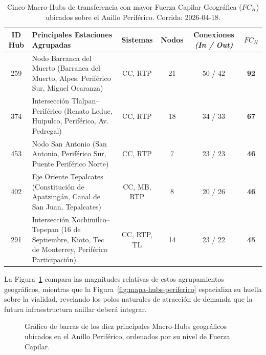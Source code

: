 \begin{table}[H]
    \centering
    \caption[Top 5 Macro-Hubs con mayor Fuerza Capilar sobre el Eje Periférico]{
    Cinco Macro-Hubs de transferencia con mayor Fuerza Capilar Geográfica
    ($FC_H$) ubicados sobre el Anillo Periférico. Corrida: 2026-04-18.}
    \label{tab:periferico-hubs-geo}
    \fontsize{8.5pt}{10.5pt}\selectfont
    \begin{tabularx}{\textwidth}{|c|X|c|c|c|c|}
        \hline
        \textbf{ID Hub} & \textbf{Principales Estaciones Agrupadas} & \textbf{Sistemas} & \textbf{Nodos} & \textbf{Conexiones} \textit{(In / Out)} & \textbf{$FC_H$} \\
        \hline
        259 & Nodo Barranca del Muerto (Barranca del Muerto, Alpes, Periférico Sur, Miguel Ocaranza) & CC, RTP & 21 & 50 / 42 & \textbf{92} \\
        \hline
        374 & Intersección Tlalpan--Periférico (Renato Leduc, Huipulco, Periférico, Av. Pedregal) & CC, RTP & 18 & 34 / 33 & \textbf{67} \\
        \hline
        453 & Nodo San Antonio (San Antonio, Periférico Sur, Puente Periférico Norte) & CC, RTP & 7 & 23 / 23 & \textbf{46} \\
        \hline
        402 & Eje Oriente Tepalcates (Constitución de Apatzingán, Canal de San Juan, Tepalcates) & CC, MB, RTP & 8 & 20 / 26 & \textbf{46} \\
        \hline
        291 & Intersección Xochimilco--Tepepan (16 de Septiembre, Kioto, Tec de Monterrey, Periférico Participación) & CC, RTP, TL & 14 & 23 / 22 & \textbf{45} \\
        \hline
    \end{tabularx}
    \vspace{1ex}
\end{table}

La Figura~\ref{fig:barplot-hubs-periferico} compara las magnitudes relativas de
estos agrupamientos geográficos, mientras que la Figura~\ref{fig:mapa-hubs-periferico}
espacializa su huella sobre la vialidad, revelando los polos naturales de atracción
de demanda que la futura infraestructura anillar deberá integrar.

\begin{figure}[H]
    \centering
    \caption[Fuerza Capilar de Macro-Hubs en Anillo Periférico]{Gráfico de barras
    de los diez principales Macro-Hubs geográficos ubicados en el Anillo Periférico,
    ordenados por su nivel de Fuerza Capilar.}
    \label{fig:barplot-hubs-periferico}
\end{figure}

